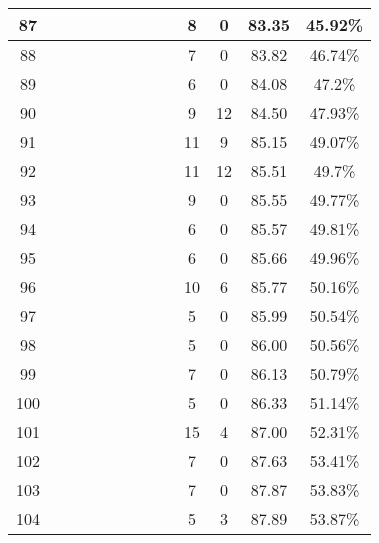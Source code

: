 \begin{longtable}{|c|c|c|c|c|c|c|c|c|c|c|c|c|}
87 &  \x    & \x    &       &       & \x    &       &       &       & 8 & 0 & 83.35 & 45.92\% \\ \hline
88 &  \x    & \x    & \x    &       & \x\m  &       & \x    &       & 7 & 0 & 83.82 & 46.74\% \\ \hline
89 &  \x    & \x    & \x    &       & \x    & \x\m  &       & \x    & 6 & 0 & 84.08 & 47.2\% \\ \hline
90 &  \x    & \x    &       & \x    & \x\m  & \x\m  & \x\m  &       & 9 & 12 & 84.50 & 47.93\% \\ \hline
91 &  \x    & \x    &       &       & \x\m  & \x\m  &       &       & 11 & 9 & 85.15 & 49.07\% \\ \hline
92 &  \x    & \x    &       & \x    & \x\m  &       &       & \x\m  & 11 & 12 & 85.51 & 49.7\% \\ \hline
93 &  \x    & \x    & \x    &       &       &       & \x    &       & 9 & 0 & 85.55 & 49.77\% \\ \hline
94 &  \x    & \x    & \x    &       &       & \x    &       & \x    & 6 & 0 & 85.57 & 49.81\% \\ \hline
95 &  \x    & \x    & \x    &       &       &       &       & \x    & 6 & 0 & 85.66 & 49.96\% \\ \hline
96 &  \x    & \x    & \x    &       & \x\m  &       & \x\m  &       & 10 & 6 & 85.77 & 50.16\% \\ \hline
97 &  \x    & \x    & \x    &       &       & \x    & \x    &       & 5 & 0 & 85.99 & 50.54\% \\ \hline
98 &  \x    & \x    &       &       & \x    & \x    &       &       & 5 & 0 & 86.00 & 50.56\% \\ \hline
99 &  \x    & \x    & \x    &       & \x\m  &       &       & \x    & 7 & 0 & 86.13 & 50.79\% \\ \hline
100 &  \x    & \x    &       & \x    &       & \x    &       &       & 5 & 0 & 86.33 & 51.14\% \\ \hline
101 &  \x    & \x    &       &       & \x\m  &       &       & \x\m  & 15 & 4 & 87.00 & 52.31\% \\ \hline
102 &  \x    & \x    & \x    &       &       & \x    &       & \x\m  & 7 & 0 & 87.63 & 53.41\% \\ \hline
103 &  \x    & \x    & \x    & \x    &       & \x\m  & \x\m  &       & 7 & 0 & 87.87 & 53.83\% \\ \hline
104 &  \x    & \x    &       &       &       & \x    &       &       & 5 & 3 & 87.89 & 53.87\% \\ \hline

\end{longtable}
